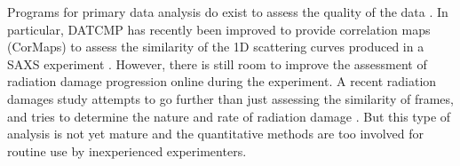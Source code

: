     Programs for primary data analysis do exist to assess the quality of the data \cite{petoukhov2012new}.
    In particular, DATCMP has recently been improved to provide correlation maps (CorMaps) to assess the similarity of the 1D scattering curves produced in a SAXS experiment \cite{franke2015correlation}.
    However, there is still room to improve the assessment of radiation damage progression online during the experiment.
    A recent radiation damages study attempts to go further than just assessing the similarity of frames, and tries to determine the nature and rate of radiation damage \cite{hopkins2016quantifying}.
    But this type of analysis is not yet mature and the quantitative methods are too involved for routine use by inexperienced experimenters.
